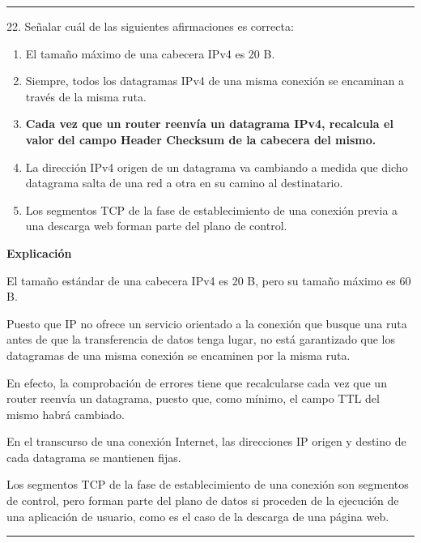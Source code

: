 \documentclass[10pt,a4paper]{article}
\begin{document}
\vspace{15pt} \hrule \vspace{15pt}




22.  Señalar cuál de las siguientes afirmaciones es correcta:

\begin{enumerate}[label=\alph*]
    \item El tamaño máximo de una cabecera IPv4 es 20 B.
    \item Siempre, todos los datagramas IPv4 de una misma conexión se encaminan a través de la misma ruta.
    \item \textbf{Cada vez que un router reenvía un datagrama IPv4, recalcula el valor del campo Header Checksum de la cabecera del mismo.}
    \item La dirección IPv4 origen de un datagrama va cambiando a medida que dicho datagrama salta de una red a otra en su camino al destinatario.
    \item Los segmentos TCP de la fase de establecimiento de una conexión previa a una descarga web forman parte del plano de control.
\end{enumerate}

\textbf{Explicación}

El tamaño estándar de una cabecera IPv4 es 20 B, pero su tamaño máximo es 60 B.

Puesto que IP no ofrece un servicio orientado a la conexión que busque una ruta antes de que la transferencia de datos tenga lugar, no está garantizado que los datagramas de una misma conexión se encaminen por la misma ruta.

En efecto, la comprobación de errores tiene que recalcularse cada vez que un router reenvía un datagrama, puesto que, como mínimo, el campo TTL del mismo habrá cambiado.

En el transcurso de una conexión Internet, las direcciones IP origen y destino de cada datagrama se mantienen fijas.

Los segmentos TCP de la fase de establecimiento de una conexión son segmentos de control, pero forman parte del plano de datos si proceden de la ejecución de una aplicación de usuario, como es el caso de la descarga de una página web.

\vspace{15pt} \hrule \vspace{15pt}
\end{document}
